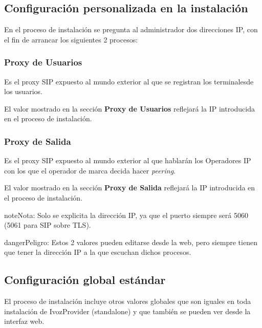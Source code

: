 \documentclass[letterpaper,10pt,spanish]{sphinxmanual}
\begin{document}


\subsection{Configuración personalizada en la instalación}
\label{internal_calls/god_portal:custom-installation-configuration}
En el proceso de instalación se pregunta al administrador dos direcciones IP, con el fin de arrancar los siguientes 2 procesos:


\subsubsection{Proxy de Usuarios}
\label{internal_calls/god_portal:proxyusers}\label{internal_calls/god_portal:users-sip-proxy}
Es el proxy SIP expuesto al mundo exterior al que se registran los terminalesde los usuarios.

El valor mostrado en la sección \textbf{Proxy de Usuarios} reflejará la IP introducida en el proceso de instalación.

\noindent{}


\subsubsection{Proxy de Salida}
\label{internal_calls/god_portal:providers-sip-proxy}
Es el proxy SIP expuesto al mundo exterior al que hablarán los Operadores IP con los que el operador de marca decida hacer \emph{peering}.

El valor mostrado en la sección \textbf{Proxy de Salida} reflejará la IP introducida en el proceso de instalación.

\noindent{}

\begin{notice}{note}{Nota:}
Solo se explicita la dirección IP, ya que el puerto siempre será 5060 (5061 para SIP sobre TLS).
\end{notice}

\begin{notice}{danger}{Peligro:}
Estos 2 valores pueden editarse desde la web, pero siempre tienen que tener la dirección IP a la que escuchan dichos procesos.
\end{notice}


\subsection{Configuración global estándar}
\label{internal_calls/god_portal:standard-global-configuration}
El proceso de instalación incluye otros valores globales que son iguales en toda instalación de IvozProvider (standalone) y que también se pueden ver desde la interfaz web.
\end{document}
